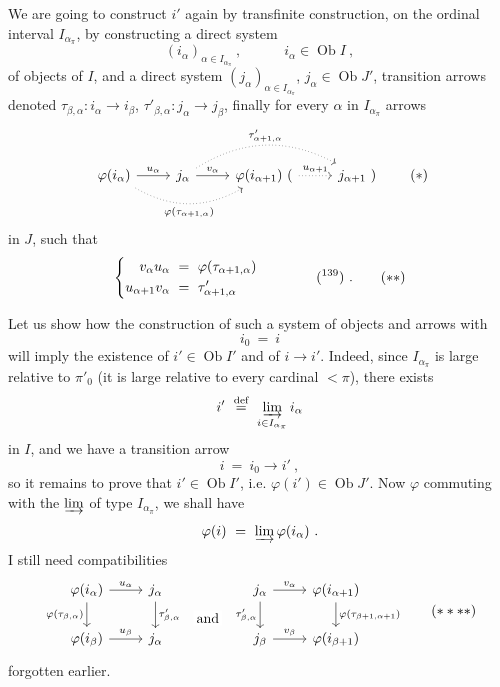 \documentclass[11pt]{article}
\newcommand{\printedpage}[1]{\marginpar{\footnotesize p.~#1}}
\newcommand{\msp}[1]{\marginpar{\footnotesize [#1]}}
\newcommand{\Ob}{\operatorname{Ob}}
\begin{document}
We are going to construct $i'$ again by transfinite construction, on the ordinal interval $I_{\alpha_\pi}$, by constructing a direct system
\[
(i_\alpha)_{\alpha\in I_{\alpha_\pi}} \ , \qquad\quad i_\alpha \in \Ob I \ ,
\]
of objects of $I$, and a direct system $(j_\alpha)_{\alpha\in I_{\alpha_\pi}}$, $j_\alpha \in \Ob J'$, transition arrows denoted $\tau_{\beta,\alpha} : i_\alpha \longrightarrow i_\beta$, $\tau'_{\beta,\alpha} : j_\alpha \longrightarrow j_\beta$, finally for every $\alpha$ in $I_{\alpha_\pi}$ arrows
\[
\begin{tikzcd}
\varphi(i_\alpha) \arrow[r, "u_\alpha"] \arrow[rr, dotted, bend right, "\varphi(\tau_{\alpha+1,\alpha})"'] & j_\alpha \arrow[r, "v_\alpha"] \arrow[rr, dotted, bend left, "\tau'_{\alpha+1,\alpha}"] & \varphi(i_{\alpha+1})\ ( \arrow[r, dotted, "u_{\alpha+1}"] & j_{\alpha+1}\ )
\end{tikzcd}
\tag*{$(*)$}
\]
\printedpage{118}
in $J$, such that
\[
\left\{
\begin{aligned}
v_\alpha u_\alpha \ &= \ \varphi(\tau_{\alpha+1,\alpha}) \\
u_{\alpha+1} v_\alpha \ &= \ \tau'_{\alpha+1,\alpha}
\end{aligned}
\right.
\qquad\qquad \text{(\footnotemark[139])} \ .
\tag*{$(**)$}
\]

\msp{page 314}\noindent Let us show how the construction of such a system of objects and arrows with
\[
i_0 \ = \ i \tag*{$(***)$}
\]
will imply the existence of $i' \in \Ob I'$ and of $i \longrightarrow i'$. Indeed, since $I_{\alpha_\pi}$ is large relative to $\pi'_0$ (it is large relative to every cardinal $< \pi$), there exists
\[
i' \ \overset{\text{def}}{=} \ \varinjlim_{i\in I_{\alpha_\pi}} i_\alpha %
\]
in $I$, and we have a transition arrow
\[
i \ = \ i_0 \longrightarrow i' \ ,
\]
so it remains to prove that $i' \in \Ob I'$, i.e. $\varphi(i') \in \Ob J'$. Now $\varphi$ commuting with the $\varinjlim$ of type $I_{\alpha_\pi}$, we shall have
\[
\varphi(i) \ = \ \varinjlim \varphi(i_\alpha) \ .
\]
I still need compatibilities
\[
\begin{tikzcd}
\varphi(i_\alpha) \arrow[r, "u_\alpha"] \arrow[d, "\varphi(\tau_{\beta,\alpha})"'] & j_\alpha \arrow[d, "\tau'_{\beta,\alpha}"] & {} \arrow[d, phantom, "\text{and}" description] & j_\alpha \arrow[r, "v_\alpha"] \arrow[d, "\tau'_{\beta,\alpha}"'] & \varphi(i_{\alpha+1}) \arrow[d, "\varphi(\tau_{\beta+1,\alpha+1})"] \\
\varphi(i_\beta) \arrow[r, "u_\beta"] & j_\alpha & {} & j_\beta \arrow[r, "v_\beta"] & \varphi(i_{\beta+1})
\end{tikzcd}
\tag*{$(****)$} %
\]
forgotten earlier.
\end{document}
